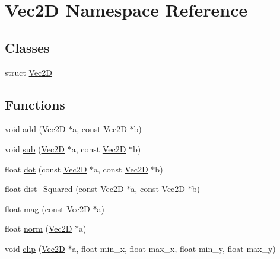 \hypertarget{namespace_vec2_d}{}\section{Vec2D Namespace Reference}
\label{namespace_vec2_d}
\subsection*{Classes}
\begin{DoxyCompactItemize}
\item 
struct \mbox{\hyperlink{struct_vec2_d_1_1_vec2_d}{Vec2D}}
\end{DoxyCompactItemize}
\subsection*{Functions}
\begin{DoxyCompactItemize}
\item 
void \mbox{\hyperlink{namespace_vec2_d_a758464ed31255ef60f9e5adb4ec514f5}{add}} (\mbox{\hyperlink{struct_vec2_d_1_1_vec2_d}{Vec2D}} $\ast$a, const \mbox{\hyperlink{struct_vec2_d_1_1_vec2_d}{Vec2D}} $\ast$b)
\item 
void \mbox{\hyperlink{namespace_vec2_d_a55f2fdb291f4880f7e7b0637ff2cf3be}{sub}} (\mbox{\hyperlink{struct_vec2_d_1_1_vec2_d}{Vec2D}} $\ast$a, const \mbox{\hyperlink{struct_vec2_d_1_1_vec2_d}{Vec2D}} $\ast$b)
\item 
float \mbox{\hyperlink{namespace_vec2_d_a05b7ad68bd9e7f4a14be8ee807a1a10a}{dot}} (const \mbox{\hyperlink{struct_vec2_d_1_1_vec2_d}{Vec2D}} $\ast$a, const \mbox{\hyperlink{struct_vec2_d_1_1_vec2_d}{Vec2D}} $\ast$b)
\item 
float \mbox{\hyperlink{namespace_vec2_d_a7d80f189a2cd8a6b8ec4c97b381aef19}{dist\+\_\+\+Squared}} (const \mbox{\hyperlink{struct_vec2_d_1_1_vec2_d}{Vec2D}} $\ast$a, const \mbox{\hyperlink{struct_vec2_d_1_1_vec2_d}{Vec2D}} $\ast$b)
\item 
float \mbox{\hyperlink{namespace_vec2_d_a6b60aee1310fda86cdee2c134251a4b9}{mag}} (const \mbox{\hyperlink{struct_vec2_d_1_1_vec2_d}{Vec2D}} $\ast$a)
\item 
float \mbox{\hyperlink{namespace_vec2_d_aa9a664b2f1aceaf4b3b874a41da766af}{norm}} (\mbox{\hyperlink{struct_vec2_d_1_1_vec2_d}{Vec2D}} $\ast$a)
\item 
void \mbox{\hyperlink{namespace_vec2_d_a625a15fa457bb1aa5b693e74837cfdc3}{clip}} (\mbox{\hyperlink{struct_vec2_d_1_1_vec2_d}{Vec2D}} $\ast$a, float min\+\_\+x, float max\+\_\+x, float min\+\_\+y, float max\+\_\+y)
\end{DoxyCompactItemize}


